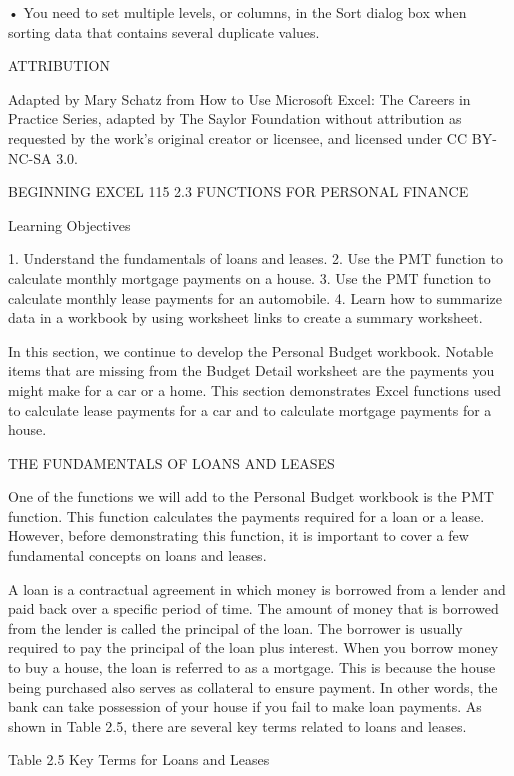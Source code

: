 • You need to set multiple levels, or columns, in the Sort dialog box when sorting data that contains several
duplicate values.



ATTRIBUTION

Adapted by Mary Schatz from How to Use Microsoft Excel: The Careers in Practice Series, adapted
by The Saylor Foundation without attribution as requested by the work’s original creator or
licensee, and licensed under CC BY-NC-SA 3.0.




BEGINNING EXCEL 115
2.3 FUNCTIONS FOR PERSONAL FINANCE




Learning Objectives


1. Understand the fundamentals of loans and leases.
2. Use the PMT function to calculate monthly mortgage payments on a house.
3. Use the PMT function to calculate monthly lease payments for an automobile.
4. Learn how to summarize data in a workbook by using worksheet links to create a summary worksheet.



In this section, we continue to develop the Personal Budget workbook. Notable items that are
missing from the Budget Detail worksheet are the payments you might make for a car or a home.
This section demonstrates Excel functions used to calculate lease payments for a car and to calculate
mortgage payments for a house.

THE FUNDAMENTALS OF LOANS AND LEASES

One of the functions we will add to the Personal Budget workbook is the PMT function. This function
calculates the payments required for a loan or a lease. However, before demonstrating this function,
it is important to cover a few fundamental concepts on loans and leases.

A loan is a contractual agreement in which money is borrowed from a lender and paid back over
a specific period of time. The amount of money that is borrowed from the lender is called
the principal of the loan. The borrower is usually required to pay the principal of the loan plus
interest. When you borrow money to buy a house, the loan is referred to as a mortgage. This is because
the house being purchased also serves as collateral to ensure payment. In other words, the bank can
take possession of your house if you fail to make loan payments. As shown in Table 2.5, there are
several key terms related to loans and leases.

Table 2.5 Key Terms for Loans and Leases




